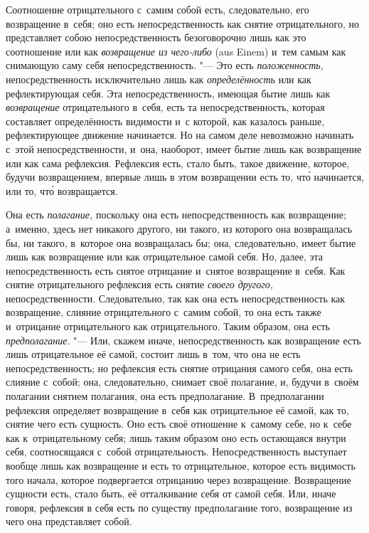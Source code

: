 Соотношение отрицательного с~самим собой есть, следовательно, его
возвращение в~себя; оно есть непосредственность как снятие отрицательного,
но представляет собою непосредственность безоговорочно лишь как это
соотношение или как {\em возвращение из чего-либо} (aus
Einem) и~тем самым как снимающую саму себя непосредственность. "--- Это есть
{\em положенность,} непосредственность исключительно
лишь как {\em определённость} или как рефлектирующая
себя. Эта непосредственность, имеющая бытие лишь как
{\em возвращение} отрицательного в~себя, есть та
непосредственность, которая составляет определённость видимости и~с
которой, как казалось раньше, рефлектирующее движение начинается. Но на
самом деле невозможно начинать с~этой непосредственности, и~она, наоборот,
имеет бытие лишь как возвращение или как сама рефлексия. Рефлексия есть,
стало быть, такое движение, которое, будучи возвращением, впервые лишь в
этом возвращении есть то, чт\'{о} начинается, или то, чт\'{о} возвращается.

Она есть {\em полагание,} поскольку она есть
непосредственность как возвращение; а~именно, здесь нет никакого другого,
ни такого, из которого она возвращалась бы, ни такого, в~которое она
возвращалась бы; она, следовательно, имеет бытие лишь как возвращение или
как отрицательное самой себя. Но, далее, эта непосредственность есть снятое
отрицание и~снятое возвращение в~себя. Как снятие отрицательного рефлексия
есть снятие {\em своего другого,} непосредственности.
Следовательно, так как она есть непосредственность как возвращение, слияние
отрицательного с~самим собой, то она есть также и~отрицание отрицательного
как отрицательного. Таким образом, она есть
{\em предполагание}. "--- Или, скажем иначе,
непосредственность как возвращение есть лишь отрицательное её самой,
состоит лишь в~том, что она не есть непосредственность; но рефлексия есть
снятие отрицания самого себя, она есть слияние с~собой; она, следовательно,
снимает своё полагание, и, будучи в~своём полагании снятием полагания, она
есть предполагание. В~предполагании рефлексия определяет возвращение в~себя
как отрицательное её самой, как то, снятие чего есть сущность. Оно есть
своё отношение к~самому себе, но к~себе как к~отрицательному себя; лишь
таким образом оно есть остающаяся внутри себя, соотносящаяся с~собой
отрицательность. Непосредственность выступает вообще лишь как возвращение и
есть то отрицательное, которое есть видимость того начала, которое
подвергается отрицанию через возвращение. Возвращение сущности есть, стало
быть, её отталкивание себя от самой себя. Или, иначе говоря, рефлексия в
себя есть по существу предполагание того, возвращение из чего она
представляет собой.

